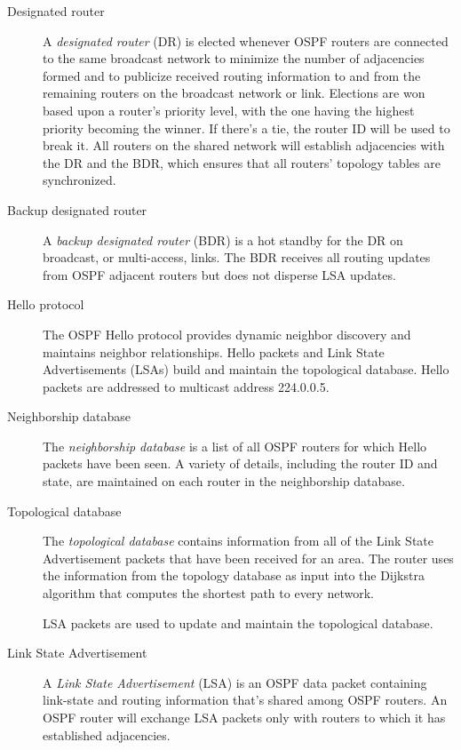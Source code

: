 \begin{description}
\item[Designated router]
   A \emph{designated router} (DR) is elected whenever OSPF routers are connected to the same broadcast network to
minimize the number of adjacencies formed and to publicize received
routing information to and from the remaining routers on the broadcast
network or link. Elections are won based upon a router's priority level,
with the one having the highest priority becoming the winner. If there's
a tie, the router ID will be used to break it. All routers on the shared
network will establish adjacencies with the DR and the BDR, which
ensures that all routers' topology tables are synchronized.

\item[Backup designated router]
   A \emph{backup designated router} (BDR) is a hot standby for the DR on broadcast, or multi-access, links. The BDR
receives all routing updates from OSPF adjacent routers but does not
disperse LSA updates.

\item[Hello protocol]
   The OSPF Hello protocol provides dynamic neighbor discovery and maintains neighbor relationships.
   Hello packets and Link State Advertisements (LSAs) build and maintain the topological database.
   Hello packets are addressed to multicast address 224.0.0.5.

\item[Neighborship database]
   The \emph{neighborship database} is a list of all OSPF routers for which Hello packets have been seen.
   A variety of details, including the router ID and state, are maintained on each router in the neighborship database.

\item[Topological database]
   The \emph{topological database} contains information from all of the Link State Advertisement packets that have been received for an area.
   The router uses the information from the topology database as input into the Dijkstra algorithm that computes the shortest path to every network.

   \begin{note}
   LSA packets are used to update and maintain the topological database.
   \end{note}

\item[Link State Advertisement]
   A \emph{Link State Advertisement} (LSA) is an OSPF data packet containing link-state and routing information that's shared among OSPF routers.
   An OSPF router will exchange LSA packets only with routers to which it has established adjacencies.


\end{description}
